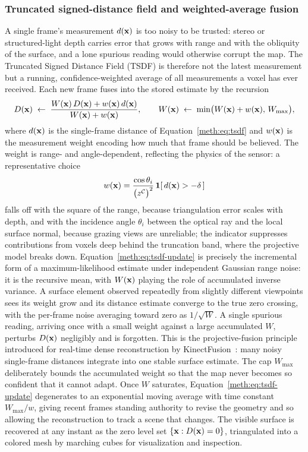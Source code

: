\subsubsection{Truncated signed-distance field and weighted-average fusion}

A single frame's measurement $d(\mathbf{x})$ is too noisy to be trusted: stereo or structured-light depth carries error that grows with range and with the obliquity of the surface, and a lone spurious reading would otherwise corrupt the map. The Truncated Signed Distance Field (TSDF) is therefore not the latest measurement but a running, confidence-weighted average of all measurements a voxel has ever received. Each new frame fuses into the stored estimate by the recursion
\begin{equation}
  D(\mathbf{x})\;\leftarrow\;\frac{W(\mathbf{x})\,D(\mathbf{x})+w(\mathbf{x})\,d(\mathbf{x})}{W(\mathbf{x})+w(\mathbf{x})},
  \qquad
  W(\mathbf{x})\;\leftarrow\;\min\!\big(W(\mathbf{x})+w(\mathbf{x}),\,W_{\max}\big),
  \label{meth:eq:tsdf-update}
\end{equation}
where $d(\mathbf{x})$ is the single-frame distance of Equation~\eqref{meth:eq:tsdf} and $w(\mathbf{x})$ is the measurement weight encoding how much that frame should be believed. The weight is range- and angle-dependent, reflecting the physics of the sensor: a representative choice
\begin{equation}
  w(\mathbf{x})=\frac{\cos\theta_i}{\big(z^{\mathcal C}\big)^2}\,\mathbf{1}\!\left[\,d(\mathbf{x})>-\delta\,\right]
  \label{meth:eq:tsdf-weight}
\end{equation}
falls off with the square of the range, because triangulation error scales with depth, and with the incidence angle $\theta_i$ between the optical ray and the local surface normal, because grazing views are unreliable; the indicator suppresses contributions from voxels deep behind the truncation band, where the projective model breaks down. Equation~\eqref{meth:eq:tsdf-update} is precisely the incremental form of a maximum-likelihood estimate under independent Gaussian range noise: it is the recursive mean, with $W(\mathbf{x})$ playing the role of accumulated inverse variance. A surface element observed repeatedly from slightly different viewpoints sees its weight grow and its distance estimate converge to the true zero crossing, with the per-frame noise averaging toward zero as $1/\sqrt{W}$. A single spurious reading, arriving once with a small weight against a large accumulated $W$, perturbs $D(\mathbf{x})$ negligibly and is forgotten. This is the projective-fusion principle introduced for real-time dense reconstruction by KinectFusion~\cite{newcombe2011kinectfusion}: many noisy single-frame distances integrate into one stable surface estimate. The cap $W_{\max}$ deliberately bounds the accumulated weight so that the map never becomes so confident that it cannot adapt. Once $W$ saturates, Equation~\eqref{meth:eq:tsdf-update} degenerates to an exponential moving average with time constant $W_{\max}/w$, giving recent frames standing authority to revise the geometry and so allowing the reconstruction to track a scene that changes. The visible surface is recovered at any instant as the zero level set $\{\mathbf{x}:D(\mathbf{x})=0\}$, triangulated into a colored mesh by marching cubes for visualization and inspection.

